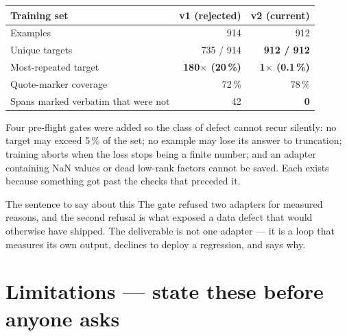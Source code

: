 \documentclass[11pt,a4paper]{article}
\begin{document}
\begin{table}[h]\centering\small
\begin{tabularx}{\textwidth}{Y r r}
\toprule
\textbf{Training set} & \textbf{v1 (rejected)} & \textbf{v2 (current)} \\
\midrule
Examples & 914 & 912 \\
 Unique targets & 735 / 914 & \textbf{912 / 912} \\
Most-repeated target & \textbf{180$\times$ (20\,\%)} & \textbf{1$\times$ (0.1\,\%)} \\
 Quote-marker coverage & 72\,\% & 78\,\% \\
Spans marked verbatim that were not & 42 & \textbf{0} \\
\bottomrule
\end{tabularx}
\end{table}

Four pre-flight gates were added so the class of defect cannot recur silently: no
target may exceed 5\,\% of the set; no example may lose its answer to truncation;
training aborts when the loss stops being a finite number; and an adapter containing
NaN values or dead low-rank factors cannot be saved. Each exists because something
got past the checks that preceded it.

\begin{keybox}{{The sentence to say about this}}
The gate refused two adapters for measured reasons, and the second refusal is what
exposed a data defect that would otherwise have shipped. The deliverable is not one
adapter --- it is a loop that measures its own output, declines to deploy a
regression, and says why.
\end{keybox}

\section{Limitations --- state these before anyone asks}
\end{document}
